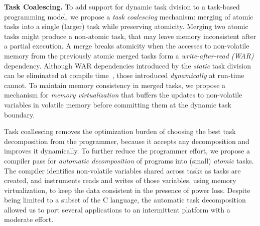 \textbf{Task Coalescing.} To add support for dynamic task
dvision to a task-based programming model, we propose a
\emph{task coalescing} mechanism: merging of atomic tasks
into a single (larger) task while preserving atomicity.
Merging two atomic tasks might produce a non-atomic task,
that may leave memory inconsistent after a partial
execution. A merge breaks atomicity when the accesses to
non-volatile memory from the previously atomic merged tasks
form a \emph{write-after-read (WAR)} dependency.
%
%
Although WAR dependencies introduced by the \emph{static}
task division can be eliminated at compile time~\cite{alpaca}, those introduced \emph{dynamically} at
run-time cannot.
%
To maintain memory consistency in merged tasks, we propose a
mechanism for \emph{memory virtualization} that buffers the
updates to non-volatile variables in volatile memory before
committing them at the dynamic task boundary.
%
%

Task coallescing removes the optimization burden of choosing
the best task decomposition from the programmer, because it
accepts any decomposition and improves it dynamically.
%
To further reduce the programmer effort, we propose a
compiler pass for \emph{automatic decomposition} of programs
into (small) \emph{atomic} tasks.
%
The compiler identifies non-volatile variables shared across
tasks as tasks are created, and instruments reads and writes
of those variables, using memory virtualization, to keep
the data consistent in the presence of power loss.
%
Despite being limited to a subset of the C language, the
automatic task decomposition allowed us to port several
applications to an intermittent platform with a moderate
effort.

